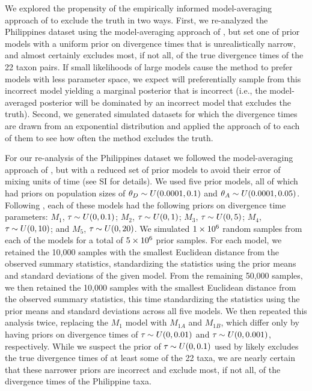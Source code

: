 \documentclass[letterpaper,12pt]{article}
\begin{document}
\begin{linenumbers}
We explored the propensity of the empirically informed model-averaging approach
of \citet{Hickerson2013} to exclude the truth in two ways.
First, we re-analyzed the Philippines dataset using the model-averaging approach
of \citet{Hickerson2013}, but set one of prior models with a uniform prior on
divergence times that is unrealistically narrow, and almost certainly excludes
most, if not all, of the true divergence times of the 22 taxon pairs.
If small likelihoods of large models cause the method to prefer models with
less parameter space, we expect \msb will preferentially sample from this
incorrect model yielding a marginal posterior that is incorrect (i.e., the
model-averaged posterior will be dominated by an incorrect model that excludes
the truth).
Second, we generated simulated datasets for which the divergence times are
drawn from an exponential distribution and applied the approach of
\citet{Hickerson2013} to each of them to see how often the method excludes the
truth.

For our re-analysis of the Philippines dataset we followed the model-averaging
approach of \citet{Hickerson2013}, but with a reduced set of prior models to
avoid their error of mixing units of time (see SI for details).
We used five prior models, all of which had priors on population sizes of
$\meanDescendantTheta{} \sim U(0.0001, 0.1)$ and $\ancestralTheta{} \sim
U(0.0001, 0.05)$.
Following \citet{Hickerson2013}, each of these models had the following
priors on divergence time parameters:
$M_1$, $\tau_{} \sim U(0, 0.1)$;
$M_2$, $\tau_{} \sim U(0, 1)$;
$M_3$, $\tau_{} \sim U(0, 5)$;
$M_4$, $\tau_{} \sim U(0, 10)$; and
$M_5$, $\tau_{} \sim U(0, 20)$.
We simulated $1\times 10^{6}$ random samples from each of the models for a total of
$5\times 10^{6}$ prior samples.
For each model, we retained the 10,000 samples with the smallest Euclidean
distance from the observed summary statistics, standardizing the statistics
using the prior means and standard deviations of the given model.
From the remaining 50,000 samples, we then retained the 10,000 samples with the
smallest Euclidean distance from the observed summary statistics, this time
standardizing the statistics using the prior means and standard deviations
across all five models.
We then repeated this analysis twice, replacing the $M_1$ model with
$M_{1A}$ and $M_{1B}$, which differ only by having priors on divergence
times of $\tau_{} \sim U(0, 0.01)$ and $\tau_{} \sim U(0, 0.001)$,
respectively.
While we suspect the prior of $\tau_{} \sim U(0, 0.1)$ used by
\citet{Hickerson2013} likely excludes the true divergence times of at least
some of the 22 taxa, we are nearly certain that these narrower priors are
incorrect and exclude most, if not all, of the divergence times of the
Philippine taxa.


\end{linenumbers}
\end{document}
